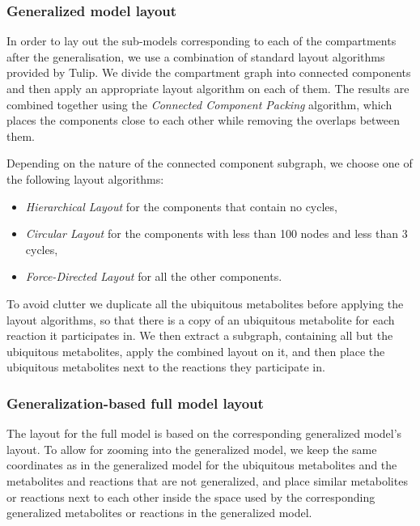 \documentclass{bmcart}
\begin{document}
\subsubsection*{Generalized model layout}
In order to lay out the sub-models corresponding to each of the compartments after the generalisation, we use a combination of standard layout algorithms provided by Tulip\cite{Auber04}. We divide the compartment graph into connected components and then apply an appropriate layout algorithm on each of them. The results are combined together using the \emph{Connected Component Packing} algorithm, which places the components close to each other while removing the overlaps between them.

Depending on the nature of the connected component subgraph, we choose one of the following layout algorithms:
\begin{itemize}
\item \emph{Hierarchical Layout} for the components that contain no cycles,
\item \emph{Circular Layout} for the components with less than 100 nodes and less than 3 cycles,
\item \emph{Force-Directed Layout} for all the other components.
\end{itemize}

To avoid clutter we duplicate all the ubiquitous metabolites before applying the layout algorithms, so that there is a copy of an ubiquitous metabolite for each reaction it participates in. We then extract a subgraph, containing all but the ubiquitous metabolites, apply the combined layout on it, and then place the ubiquitous metabolites next to the reactions they participate in.

\subsubsection*{Generalization-based full model layout}
The layout for the full model is based on the corresponding generalized model's layout. To allow for zooming into the generalized model, we keep the same coordinates as in the generalized model for the ubiquitous metabolites and the metabolites and reactions that are not generalized, and place similar metabolites or reactions next to each other inside the space used by the corresponding generalized metabolites or reactions in the generalized model.
 
\end{document}

